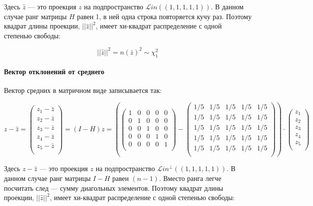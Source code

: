\documentclass[11pt,russian,]{article}
\let\oldparagraph\paragraph
\renewcommand{\paragraph}[1]{\oldparagraph{#1}\mbox{}}
\newcommand{\1}{\mathbbm{1}}
\newcommand{\Lin}{\mathcal{L}in}
\newcommand{\Linp}{\Lin^{\perp}}
\begin{document}
Здесь \(\hat z\) --- это проекция \(z\) на подпространство
\(\Lin((1, 1, 1, 1, 1))\). В данном случае ранг матрицы \(H\) равен 1, в
ней одна строка повторяется кучу раз. Поэтому квадрат длины проекции,
\(||\hat z||^2\), имеет хи-квадрат распределение с одной степенью
свободы:

\[
||\hat z||^2 = n(\bar z)^2 \sim \chi^2_1
\]

\paragraph{Вектор отклонений от среднего}\label{---}

Вектор средних в матричном виде записывается так:

\[
z - \hat z =
\begin{pmatrix}
z_1 - \bar z \\
z_2 - \bar z \\
z_3 - \bar z \\
z_4 - \bar z \\
z_5 - \bar z \\
\end{pmatrix} = 
(I-H)z=
\left(
\begin{pmatrix}
1 & 0 & 0 & 0 & 0 \\
0 & 1 & 0 & 0 & 0 \\
0 & 0 & 1 & 0 & 0 \\
0 & 0 & 0 & 1 & 0 \\
0 & 0 & 0 & 0 & 1 \\
\end{pmatrix} -
\begin{pmatrix}
1/5 & 1/5 & 1/5 & 1/5 & 1/5 \\
1/5 & 1/5 & 1/5 & 1/5 & 1/5 \\
1/5 & 1/5 & 1/5 & 1/5 & 1/5 \\
1/5 & 1/5 & 1/5 & 1/5 & 1/5 \\
1/5 & 1/5 & 1/5 & 1/5 & 1/5 \\
\end{pmatrix} 
\right)
\cdot 
\begin{pmatrix}
z_1 \\
z_2 \\
z_3 \\
z_4 \\
z_5 \\
\end{pmatrix}
\]

Здесь \(z - \hat z\) --- это проекция \(z\) на подпространство
\(\Linp((1, 1, 1, 1, 1))\). В данном случае ранг матрицы \(I-H\) равен
\((n-1)\). Вместо ранга легче посчитать след --- сумму диагольных
элементов. Поэтому квадрат длины проекции, \(||\hat z||^2\), имеет
хи-квадрат распределение с одной степенью свободы:
\end{document}
